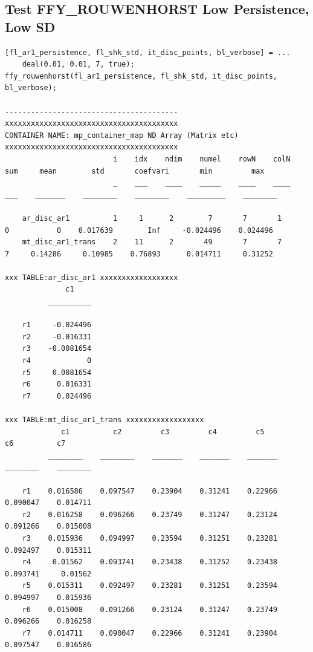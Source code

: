 \documentclass[
]{book}
\begin{document}
\hypertarget{test-ffy_rouwenhorst-low-persistence-low-sd}{%
\subsection{Test FFY\_ROUWENHORST Low Persistence, Low SD}\label{test-ffy_rouwenhorst-low-persistence-low-sd}}

\begin{verbatim}
[fl_ar1_persistence, fl_shk_std, it_disc_points, bl_verbose] = ...
    deal(0.01, 0.01, 7, true);
ffy_rouwenhorst(fl_ar1_persistence, fl_shk_std, it_disc_points, bl_verbose);

----------------------------------------
xxxxxxxxxxxxxxxxxxxxxxxxxxxxxxxxxxxxxxxx
CONTAINER NAME: mp_container_map ND Array (Matrix etc)
xxxxxxxxxxxxxxxxxxxxxxxxxxxxxxxxxxxxxxxx
                         i    idx    ndim    numel    rowN    colN    sum     mean        std       coefvari       min         max   
                         _    ___    ____    _____    ____    ____    ___    _______    ________    ________    _________    ________

    ar_disc_ar1          1     1      2        7       7       1       0           0    0.017639        Inf     -0.024496    0.024496
    mt_disc_ar1_trans    2    11      2       49       7       7       7     0.14286     0.10985    0.76893      0.014711     0.31252

xxx TABLE:ar_disc_ar1 xxxxxxxxxxxxxxxxxx
              c1    
          __________

    r1     -0.024496
    r2     -0.016331
    r3    -0.0081654
    r4             0
    r5     0.0081654
    r6      0.016331
    r7      0.024496

xxx TABLE:mt_disc_ar1_trans xxxxxxxxxxxxxxxxxx
             c1          c2         c3         c4         c5          c6          c7   
          ________    ________    _______    _______    _______    ________    ________

    r1    0.016586    0.097547    0.23904    0.31241    0.22966    0.090047    0.014711
    r2    0.016258    0.096266    0.23749    0.31247    0.23124    0.091266    0.015008
    r3    0.015936    0.094997    0.23594    0.31251    0.23281    0.092497    0.015311
    r4     0.01562    0.093741    0.23438    0.31252    0.23438    0.093741     0.01562
    r5    0.015311    0.092497    0.23281    0.31251    0.23594    0.094997    0.015936
    r6    0.015008    0.091266    0.23124    0.31247    0.23749    0.096266    0.016258
    r7    0.014711    0.090047    0.22966    0.31241    0.23904    0.097547    0.016586


\end{verbatim}
\end{document}

